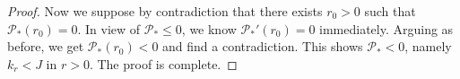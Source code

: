 \documentclass[10pt,a4paper]{amsart}
\newcommand{\p}{\mathcal{P}}
\begin{document}
\begin{proof}
		Now we suppose by contradiction that there exists $r_0 > 0$ such that $\p_*(r_0) = 0$. In view of $\p_* \le 0$, we know $\p_*'(r_0) = 0$ immediately. Arguing as before, we get $\p_*(r_0) < 0$ and find a contradiction. This shows $\p_* < 0$, namely $k_r < J$ in $r > 0$. The proof is complete.
	\end{proof}
\end{document}
